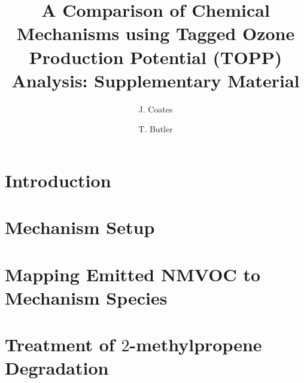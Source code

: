 \documentclass[11pt,a4paper]{article}
\title{A Comparison of Chemical Mechanisms using Tagged Ozone Production Potential (TOPP) Analysis: Supplementary Material}
\author[1]{J. Coates}%
\author[1]{T. Butler}
\affil[1]{Institute for Advanced Sustainability Studies, Potsdam, Germany}
\begin{document}
\maketitle
%
\section{Introduction} \label{s:introduction}

%
\section{Mechanism Setup} \label{s:mechanism}

%
\section{Mapping Emitted NMVOC to Mechanism Species}

%
\section{Treatment of $2$-methylpropene Degradation}

%
%
%

 
\end{document}
